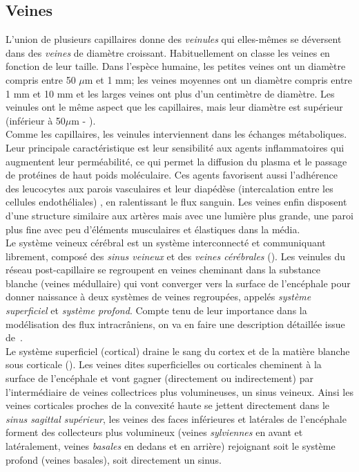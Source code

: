\subsection{Veines}
L'union de plusieurs capillaires donne des {\em veinules} qui elles-mêmes se déversent dans des {\em veines} de diamètre croissant. Habituellement on classe les veines en fonction de leur taille. Dans l'espèce humaine, les petites veines ont un diamètre compris entre 50 $\mu$m et 1 mm; les veines moyennes ont un diamètre compris entre 1 mm et 10 mm et les larges veines ont plus d'un centimètre de diamètre. Les veinules ont le même aspect que les capillaires, mais leur diamètre est supérieur (inférieur à 50$\mu$m - \cite{Martini2009}).\\
Comme les capillaires, les veinules interviennent dans les échanges métaboliques. Leur principale caractéristique est leur sensibilité aux agents inflammatoires qui augmentent leur perméabilité, ce qui permet la diffusion du plasma et le passage de protéines de haut poids moléculaire. Ces agents favorisent aussi l'adhérence des leucocytes aux parois vasculaires et leur diapédèse (intercalation entre les cellules endothéliales) , en ralentissant le flux sanguin. Les veines enfin disposent d’une structure similaire aux artères mais avec une lumière plus grande, une paroi plus fine avec peu d’éléments musculaires et élastiques dans la média.\\
Le système veineux cérébral est un système interconnecté et communiquant librement, composé des {\em sinus veineux} et des {\em veines cérébrales} (\cite{Schaller2004}). Les veinules du réseau post-capillaire se regroupent en veines cheminant dans la substance blanche (veines médullaire) qui vont converger vers la surface de l'encéphale pour donner naissance à deux systèmes de veines regroupées, appelés {\em système superficiel} et {\em système profond}. Compte tenu de leur importance dans la modélisation des flux intracr\^aniens, on va en faire une description détaillée issue de~\cite{radioanatDrainage}.\\
Le système superficiel (cortical) draine le sang du cortex et de la matière blanche sous corticale (\cite{Aydin1997}). Les veines dites superficielles ou corticales cheminent à la surface de l’encéphale et vont gagner (directement ou indirectement) par l’intermédiaire de veines collectrices plus volumineuses, un sinus veineux. Ainsi les veines corticales proches de la convexité haute se jettent directement dans le {\em sinus sagittal supérieur}, les veines des faces inférieures et latérales de l’encéphale forment des collecteurs plus volumineux (veines {\em sylviennes} en avant et latéralement, veines {\em basales} en dedans et en arrière) rejoignant soit le système profond (veines basales), soit directement un sinus.\\
